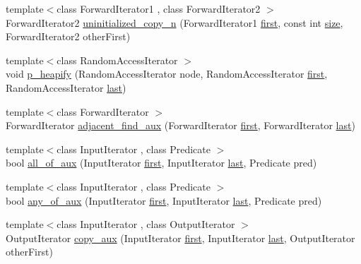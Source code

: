 \begin{DoxyCompactItemize}
\item 
{\footnotesize template$<$class Forward\+Iterator1 , class Forward\+Iterator2 $>$ }\\Forward\+Iterator2 \hyperlink{namespaceprism_ad1c7d8eb38174ba66d98321b68047e6e}{uninitialized\+\_\+copy\+\_\+n} (Forward\+Iterator1 \hyperlink{namespaceprism_ae3fb7a1926a9e8e59300cd5e370470da}{first}, const int \hyperlink{namespaceprism_acd3c0f96adf158a29387191d79c4d874}{size}, Forward\+Iterator2 other\+First)
\item 
{\footnotesize template$<$class Random\+Access\+Iterator $>$ }\\void \hyperlink{namespaceprism_a5f2c83ae0d89a6581d1c42ba6fd79de0}{p\+\_\+heapify} (Random\+Access\+Iterator node, Random\+Access\+Iterator \hyperlink{namespaceprism_ae3fb7a1926a9e8e59300cd5e370470da}{first}, Random\+Access\+Iterator \hyperlink{namespaceprism_abe4956c4e865f55ca126b7fb973b5078}{last})
\item 
{\footnotesize template$<$class Forward\+Iterator $>$ }\\Forward\+Iterator \hyperlink{namespaceprism_a6b26c227e2d379b9d934a85a2570bae7}{adjacent\+\_\+find\+\_\+aux} (Forward\+Iterator \hyperlink{namespaceprism_ae3fb7a1926a9e8e59300cd5e370470da}{first}, Forward\+Iterator \hyperlink{namespaceprism_abe4956c4e865f55ca126b7fb973b5078}{last})
\item 
{\footnotesize template$<$class Input\+Iterator , class Predicate $>$ }\\bool \hyperlink{namespaceprism_adee0c5bacf315d8cfdc4de7151ba2295}{all\+\_\+of\+\_\+aux} (Input\+Iterator \hyperlink{namespaceprism_ae3fb7a1926a9e8e59300cd5e370470da}{first}, Input\+Iterator \hyperlink{namespaceprism_abe4956c4e865f55ca126b7fb973b5078}{last}, Predicate pred)
\item 
{\footnotesize template$<$class Input\+Iterator , class Predicate $>$ }\\bool \hyperlink{namespaceprism_aae3105c7afbb375201f4691b7ea966b4}{any\+\_\+of\+\_\+aux} (Input\+Iterator \hyperlink{namespaceprism_ae3fb7a1926a9e8e59300cd5e370470da}{first}, Input\+Iterator \hyperlink{namespaceprism_abe4956c4e865f55ca126b7fb973b5078}{last}, Predicate pred)
\item 
{\footnotesize template$<$class Input\+Iterator , class Output\+Iterator $>$ }\\Output\+Iterator \hyperlink{namespaceprism_a8fc5dc440a705fbe80912a49ea6d899b}{copy\+\_\+aux} (Input\+Iterator \hyperlink{namespaceprism_ae3fb7a1926a9e8e59300cd5e370470da}{first}, Input\+Iterator \hyperlink{namespaceprism_abe4956c4e865f55ca126b7fb973b5078}{last}, Output\+Iterator other\+First)

\end{DoxyCompactItemize}
